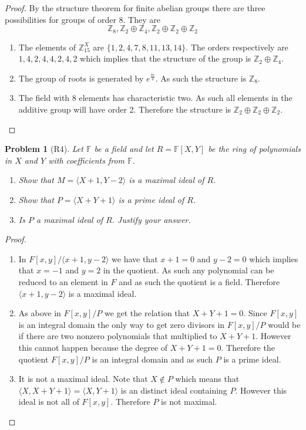 \documentclass[10pt]{article}
\newcommand{\sk}{\vskip 10mm}
\newcommand{\bb}[1]{\mathbb{#1}}
\theoremstyle{plain}
\newtheorem{problem}{Problem}
\theoremstyle{remark}
\begin{document}
\begin{proof}
  By the structure theorem for finite abelian groups there are three
  possibilities for groups of order 8. They are
  \[ \bb{Z}_8,\bb{Z}_2\oplus\bb{Z}_4, \bb{Z}_2\oplus\bb{Z}_2\oplus\bb{Z}_2 \]

  \begin{enumerate}
  \item The elements of $\bb{Z}_{15}^X$ are $\{1,2,4,7,8,11,13,14\}$. The
    orders respectively are $1,4,2,4,4,2,4,2$ which implies that
    the structure of the group is $\bb{Z}_2\oplus\bb{Z}_4$.
  \item The group of roots is generated by $e^{\frac{\pi i}{4}}$. As such the
    structure is $\bb{Z}_8$.
  \item The field with 8 elements has characteristic two. As such
    all elements in the additive group will have order 2. Therefore
    the structure is $\bb{Z}_2\oplus\bb{Z}_2\oplus\bb{Z}_2$.
  \end{enumerate}
\end{proof}

\sk


\begin{problem}[R4]
  Let $\bb{F}$ be a field and let $R=\bb{F}[X,Y]$ be the ring of polynomials
  in $X$ and $Y$ with coefficients from $\bb{F}$.
  \begin{enumerate}
  \item Show that $M=\langle X+1,Y-2\rangle$ is a maximal ideal of $R$.
  \item Show that $P=\langle X+Y+1\rangle$ is a prime ideal of $R$.
  \item Is $P$ a maximal ideal of $R$. Justify your answer.
  \end{enumerate}
\end{problem}

\begin{proof}
  \begin{enumerate}
  \item In $F[x,y]/\langle x+1,y-2\rangle$ we have that $x+1=0$ and $y-2=0$ which
    implies that $x=-1$ and $y=2$ in the quotient. As such any polynomial
    can be reduced to an element in $F$ and as such the quotient is a field.
    Therefore $\langle x+1,y-2\rangle$ is a maximal ideal.
  \item As above in $F[x,y]/P$ we get the relation that $X+Y+1=0$. Since
    $F[x,y]$ is an integral domain the only way to get zero divisors in
    $F[x,y]/P$ would be if there are two nonzero polynomials that multiplied
    to $X+Y+1$. However this cannot happen because the degree of $X+Y+1=0$.
    Therefore the quotient $F[x,y]/P$ is an integral domain and as such $P$
    is a prime ideal.
  \item It is not a maximal ideal. Note that $X\notin P$ which means that $\langle X,X+Y+1\rangle=\langle X,Y+1\rangle$
    is an distinct ideal containing $P$.  However this ideal is not all of $F[x,y]$.
    Therefore $P$ is not maximal.
  \end{enumerate}
\end{proof}
\end{document}
